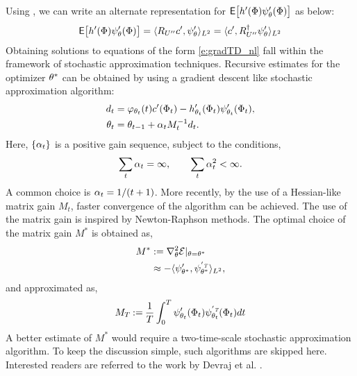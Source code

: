 Using , we can write an alternate representation for ${\sf E} \bigl[ h'(\Phi)\psi'_\theta (\Phi)\bigr]$ as below:
\begin{eqnarray*}
	{\sf E}\bigl[h'(\Phi)\psi'_\theta (\Phi)\bigr]=\langle R_{U''}c',\psi'_\theta\rangle_{L^2} =\langle c', R_{U''}^\dagger \psi'_\theta\rangle_{L^2}
\end{eqnarray*}
Obtaining solutions to equations of the form \eqref{e:gradTD_nl} fall within the framework of stochastic approximation techniques. Recursive estimates for the optimizer $\theta^*$ can be obtained by using a gradient descent like stochastic approximation algorithm: %
\begin{equation}
\begin{aligned} 
d_t & =\eligibvector_{\param_t}(t)  c'(\markovstate_t)- h'_{\param_{t}}(\markovstate_t)\basis'_{\param_{t}}(\markovstate_t), \\
\param_t &=\param_{t-1} + \sagain_t M_{t}^{-1} d_t. 
\label{e:gradTD_theta_sa}
\end{aligned}
\end{equation}
Here, $\{\alpha_t\}$ is a positive gain sequence, subject to the conditions, 
\begin{equation}
\sum_t \alpha_t = \infty, \qquad \sum_t \alpha_t^2 < \infty.
\end{equation}
A common choice is $\alpha_t = 1/(t+1)$. More recently, by the use of a Hessian-like matrix gain $M_t$, faster convergence of the algorithm can be achieved. The use of the matrix gain is inspired by Newton-Raphson methods. The optimal choice of the matrix gain $M^*$ is obtained as, 
\begin{equation}
\begin{aligned}
M^* &:= \nabla^2_{\theta}\mathcal{E}|_{\theta = \theta^*}\\
& \approx  - \langle \psi'_{\theta^*}, \psi_{\theta^*}^{'{\hbox{\tiny\it T}}} \rangle_{L^2}, 
\end{aligned}
\end{equation}
and approximated as,
\begin{equation}
M_T  \mathbin{:=}  \frac{1}{T} \int_0^T \psi'_{\theta_t}(\Phi_t) \psi^{'{\hbox{\tiny\it T}}}_{\theta_t}(\Phi_t) dt
\end{equation}
A better estimate of $M^*$ would require a two-time-scale stochastic approximation algorithm. To keep the discussion simple, such algorithms are skipped here. Interested readers are referred to the work by Devraj et al. \cite{devmey17a}.
 
